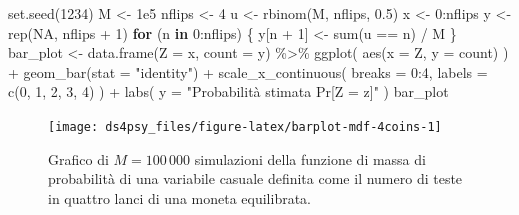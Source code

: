 \documentclass[
  11pt,
]{krantz}
\makeatletter
\newenvironment{Shaded}{\begin{snugshade}}{\end{snugshade}}
\newcommand{\AttributeTok}[1]{\textcolor[rgb]{0.61,0.61,0.61}{#1}}
\newcommand{\ConstantTok}[1]{\textcolor[rgb]{0,0,0}{#1}}
\newcommand{\ControlFlowTok}[1]{\textcolor[rgb]{0.27,0.27,0.27}{\textbf{#1}}}
\newcommand{\DecValTok}[1]{\textcolor[rgb]{0.06,0.06,0.06}{#1}}
\newcommand{\FloatTok}[1]{\textcolor[rgb]{0.06,0.06,0.06}{#1}}
\newcommand{\FunctionTok}[1]{\textcolor[rgb]{0,0,0}{#1}}
\newcommand{\NormalTok}[1]{#1}
\newcommand{\OtherTok}[1]{\textcolor[rgb]{0.37,0.37,0.37}{#1}}
\newcommand{\SpecialCharTok}[1]{\textcolor[rgb]{0,0,0}{#1}}
\newcommand{\StringTok}[1]{\textcolor[rgb]{0.5,0.5,0.5}{#1}}
\newenvironment{kframe}{%
\medskip{}
\setlength{\fboxsep}{.8em}
 \def\at@end@of@kframe{}%
 \ifinner\ifhmode%
  \def\at@end@of@kframe{\end{minipage}}%
  \begin{minipage}{\columnwidth}%
 \fi\fi%
 \def\FrameCommand##1{\hskip\@totalleftmargin \hskip-\fboxsep
 \colorbox{shadecolor}{##1}\hskip-\fboxsep
     \hskip-\linewidth \hskip-\@totalleftmargin \hskip\columnwidth}%
 \MakeFramed {\advance\hsize-\width
   \@totalleftmargin\z@ \linewidth\hsize
   \@setminipage}}%
 {\par\unskip\endMakeFramed%
 \at@end@of@kframe}
\renewenvironment{Shaded}{\begin{kframe}}{\end{kframe}}
\theoremstyle{definition}
\theoremstyle{definition}
\theoremstyle{definition}
\theoremstyle{definition}
\theoremstyle{remark}
\makeatother
\begin{document}
\begin{Shaded}
\begin{Highlighting}[]
\FunctionTok{set.seed}\NormalTok{(}\DecValTok{1234}\NormalTok{)}
\NormalTok{M }\OtherTok{\textless{}{-}} \FloatTok{1e5}
\NormalTok{nflips }\OtherTok{\textless{}{-}} \DecValTok{4}
\NormalTok{u }\OtherTok{\textless{}{-}} \FunctionTok{rbinom}\NormalTok{(M, nflips, }\FloatTok{0.5}\NormalTok{)}
\NormalTok{x }\OtherTok{\textless{}{-}} \DecValTok{0}\SpecialCharTok{:}\NormalTok{nflips}
\NormalTok{y }\OtherTok{\textless{}{-}} \FunctionTok{rep}\NormalTok{(}\ConstantTok{NA}\NormalTok{, nflips }\SpecialCharTok{+} \DecValTok{1}\NormalTok{)}
\ControlFlowTok{for}\NormalTok{ (n }\ControlFlowTok{in} \DecValTok{0}\SpecialCharTok{:}\NormalTok{nflips) \{}
\NormalTok{  y[n }\SpecialCharTok{+} \DecValTok{1}\NormalTok{] }\OtherTok{\textless{}{-}} \FunctionTok{sum}\NormalTok{(u }\SpecialCharTok{==}\NormalTok{ n) }\SpecialCharTok{/}\NormalTok{ M}
\NormalTok{\}}
\NormalTok{bar\_plot }\OtherTok{\textless{}{-}}
  \FunctionTok{data.frame}\NormalTok{(}\AttributeTok{Z =}\NormalTok{ x, }\AttributeTok{count =}\NormalTok{ y) }\SpecialCharTok{\%\textgreater{}\%}
  \FunctionTok{ggplot}\NormalTok{(}
    \FunctionTok{aes}\NormalTok{(}\AttributeTok{x =}\NormalTok{ Z, }\AttributeTok{y =}\NormalTok{ count)}
\NormalTok{  ) }\SpecialCharTok{+}
  \FunctionTok{geom\_bar}\NormalTok{(}\AttributeTok{stat =} \StringTok{"identity"}\NormalTok{) }\SpecialCharTok{+}
  \FunctionTok{scale\_x\_continuous}\NormalTok{(}
    \AttributeTok{breaks =} \DecValTok{0}\SpecialCharTok{:}\DecValTok{4}\NormalTok{,}
    \AttributeTok{labels =} \FunctionTok{c}\NormalTok{(}\DecValTok{0}\NormalTok{, }\DecValTok{1}\NormalTok{, }\DecValTok{2}\NormalTok{, }\DecValTok{3}\NormalTok{, }\DecValTok{4}\NormalTok{)}
\NormalTok{  ) }\SpecialCharTok{+}
  \FunctionTok{labs}\NormalTok{(}
    \AttributeTok{y =} \StringTok{"Probabilità stimata Pr[Z = z]"}
\NormalTok{  )}
\NormalTok{bar\_plot}
\end{Highlighting}
\end{Shaded}

\begin{figure}[h]

{\centering \texttt{[image: ds4psy\_files/figure-latex/barplot-mdf-4coins-1]} 

}

\caption{Grafico di $M = 100\,000$ simulazioni della funzione di massa di probabilità di una variabile casuale definita come il numero di teste in quattro lanci di una moneta equilibrata.}\label{fig:barplot-mdf-4coins}
\end{figure}
\end{document}
